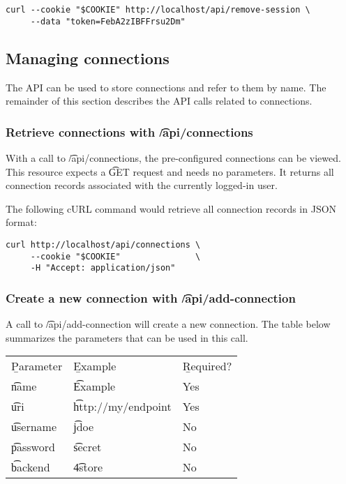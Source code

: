 \begin{siderules}
\begin{verbatim}
curl --cookie "$COOKIE" http://localhost/api/remove-session \
     --data "token=FebA2zIBFFrsu2Dm"
\end{verbatim}
\end{siderules}

\subsection{Managing connections}

  The API can be used to store connections and refer to them by name.  The
  remainder of this section describes the API calls related to connections.

\subsubsection{Retrieve connections with \t{/api/connections}}

  With a call to \t{/api/connections}, the pre-configured connections
  can be viewed.  This resource expects a \t{GET} request and needs no
  parameters.  It returns all connection records associated with the currently
  logged-in user.

  The following cURL command would retrieve all connection records in JSON
  format:

\begin{siderules}
\begin{verbatim}
curl http://localhost/api/connections \
     --cookie "$COOKIE"               \
     -H "Accept: application/json"
\end{verbatim}
\end{siderules}

\subsubsection{Create a new connection with \t{/api/add-connection}}
\label{sec:api-create-connection}

  A call to \t{/api/add-connection} will create a new connection.
  The table below summarizes the parameters that can be used in this call.

  \hypersetup{urlcolor=black}
  \begin{table}[H]
    \begin{tabularx}{\textwidth}{l!{\VRule[-1pt]}X!{\VRule[-1pt]}X}
      \headrow
      \b{Parameter} & \b{Example}            & \b{Required?}\\
      \evenrow
      \t{name}      & \t{Example}            & Yes\\
      \oddrow
      \t{uri}       & \t{http://my/endpoint} & Yes\\
      \evenrow
      \t{username}  & \t{jdoe}               & No\\
      \oddrow
      \t{password}  & \t{secret}             & No\\
      \evenrow
      \t{backend}   & \t{4store}             & No\\
    \end{tabularx}
  \end{table}
  \hypersetup{urlcolor=LinkGray}

